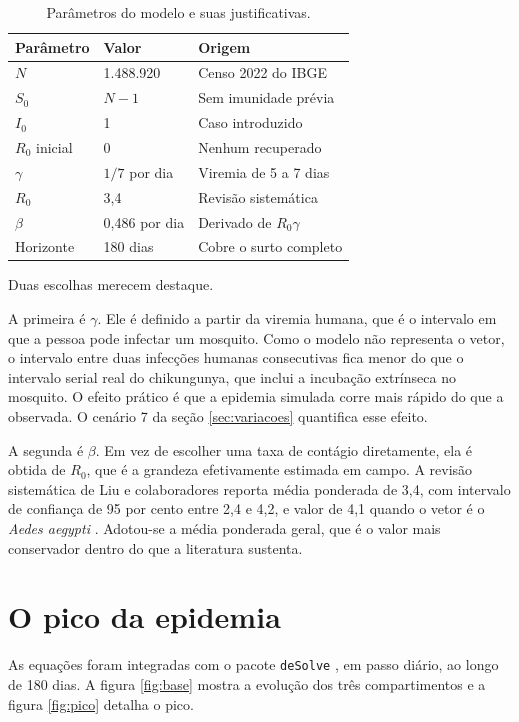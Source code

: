 \documentclass[11pt,a4paper]{article}
\begin{document}
\begin{table}[!ht]
\centering
\caption{Parâmetros do modelo e suas justificativas.}
\label{tab:parametros}
\small
\begin{tabular}{lll}
\toprule
\textbf{Parâmetro} & \textbf{Valor} & \textbf{Origem} \\
\midrule
$N$ & 1.488.920 & Censo 2022 do IBGE \cite{ibge2022} \\
$S_0$ & $N - 1$ & Sem imunidade prévia \\
$I_0$ & 1 & Caso introduzido \\
$R_0$ inicial & 0 & Nenhum recuperado \\
$\gamma$ & $1/7$ por dia & Viremia de 5 a 7 dias \cite{cdc} \\
$R_0$ & 3,4 & Revisão sistemática \cite{liu2020} \\
$\beta$ & 0,486 por dia & Derivado de $R_0 \gamma$ \\
Horizonte & 180 dias & Cobre o surto completo \\
\bottomrule
\end{tabular}
\end{table}

Duas escolhas merecem destaque.

A primeira é $\gamma$. Ele é definido a partir da viremia humana, que é o intervalo em que a pessoa pode
infectar um mosquito. Como o modelo não representa o vetor, o intervalo entre duas infecções humanas
consecutivas fica menor do que o intervalo serial real do chikungunya, que inclui a incubação extrínseca
no mosquito. O efeito prático é que a epidemia simulada corre mais rápido do que a observada. O cenário 7
da seção \ref{sec:variacoes} quantifica esse efeito.

A segunda é $\beta$. Em vez de escolher uma taxa de contágio diretamente, ela é obtida de $R_0$, que é a
grandeza efetivamente estimada em campo. A revisão sistemática de Liu e colaboradores reporta média
ponderada de 3,4, com intervalo de confiança de 95 por cento entre 2,4 e 4,2, e valor de 4,1 quando o
vetor é o \textit{Aedes aegypti} \cite{liu2020}. Adotou-se a média ponderada geral, que é o valor mais
conservador dentro do que a literatura sustenta.

\section{O pico da epidemia}

As equações foram integradas com o pacote \texttt{deSolve} \cite{desolve}, em passo diário, ao longo de
180 dias. A figura \ref{fig:base} mostra a evolução dos três compartimentos e a figura \ref{fig:pico}
detalha o pico.
\end{document}
